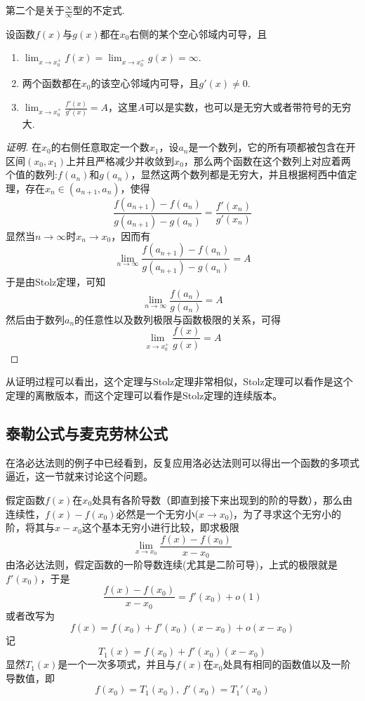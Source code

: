 第二个是关于$\frac{\infty}{\infty}$型的不定式.
\begin{theorem}
  设函数$f(x)$与$g(x)$都在$x_0$右侧的某个空心邻域内可导，且
  \begin{enumerate}
  \item $\lim_{x \to x_0^+} f(x) = \lim_{x \to x_0^+} g(x) = \infty$.
  \item 两个函数都在$x_0$的该空心邻域内可导，且$g'(x) \neq 0$.
  \item $\lim_{x \to x_0^+} \frac{f'(x)}{g'(x)} = A$，这里$A$可以是实数，也可以是无穷大或者带符号的无穷大.
  \end{enumerate}
\end{theorem}

\begin{proof}[证明]
  在$x_0$的右侧任意取定一个数$x_1$，设$a_n$是一个数列，它的所有项都被包含在开区间$(x_0,x_1)$上并且严格减少并收敛到$x_0$，那么两个函数在这个数列上对应着两个值的数列:$f(a_n)$和$g(a_n)$，显然这两个数列都是无穷大，并且根据柯西中值定理，存在$x_n \in (a_{n+1},a_n)$，使得
  \[ \frac{f(a_{n+1})-f(a_n)}{g(a_{n+1})-g(a_n)} = \frac{f'(x_n)}{g'(x_n)} \]
  显然当$n \to \infty$时$x_n \to x_0$，因而有
  \[ \lim_{n \to \infty} \frac{f(a_{n+1})-f(a_n)}{g(a_{n+1})-g(a_n)} = A \]
  于是由Stolz定理，可知
  \[ \lim_{n \to \infty} \frac{f(a_n)}{g(a_n)} = A \]
  然后由于数列$a_n$的任意性以及数列极限与函数极限的关系，可得
  \[ \lim_{x \to x_0^+} \frac{f(x)}{g(x)} = A \]
\end{proof}

从证明过程可以看出，这个定理与Stolz定理非常相似，Stolz定理可以看作是这个定理的离散版本，而这个定理可以看作是Stolz定理的连续版本。

\subsection{泰勒公式与麦克劳林公式}
\label{sec:taylor-formular}

在洛必达法则的例子中已经看到，反复应用洛必达法则可以得出一个函数的多项式逼近，这一节就来讨论这个问题。

假定函数$f(x)$在$x_0$处具有各阶导数（即直到接下来出现到的阶的导数），那么由连续性，$f(x)-f(x_0)$必然是一个无穷小($x \to x_0$)，为了寻求这个无穷小的阶，将其与$x-x_0$这个基本无穷小进行比较，即求极限
\[ \lim_{x \to x_0} \frac{f(x)-f(x_0)}{x-x_0} \]
由洛必达法则，假定函数的一阶导数连续(尤其是二阶可导)，上式的极限就是$f'(x_0)$，于是
\[ \frac{f(x)-f(x_0)}{x-x_0} = f'(x_0) + o(1) \]
或者改写为
\[ f(x) = f(x_0) + f'(x_0) (x-x_0) + o(x-x_0) \]
记
\[ T_1(x) = f(x_0)+f'(x_0)(x-x_0) \]
显然$T_1(x)$是一个一次多项式，并且与$f(x)$在$x_0$处具有相同的函数值以及一阶导数值，即
\[ f(x_0) = T_1(x_0), \  f'(x_0) = T_1'(x_0) \]

